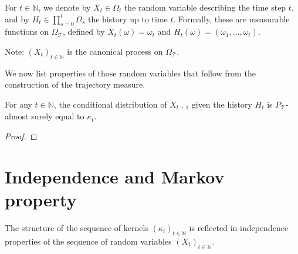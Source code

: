 \begin{definition}\label{def:history}
For $t \in \mathbb{N}$, we denote by $X_t \in \Omega_t$ the random variable describing the time step $t$, and by $H_t \in \prod_{s=0}^t \Omega_s$ the history up to time $t$.
Formally, these are measurable functions on $\Omega_{\mathcal{T}}$, defined by $X_t(\omega) = \omega_t$ and $H_t(\omega) = (\omega_1, \ldots, \omega_t)$.
\end{definition}

Note: $(X_t)_{t \in \mathbb{N}}$ is the canonical process on $\Omega_{\mathcal{T}}$.

We now list properties of those random variables that follow from the construction of the trajectory measure.

\begin{lemma}\label{lem:condDistrib_X_add_one}
For any $t \in \mathbb{N}$, the conditional distribution of $X_{t+1}$ given the history $H_t$ is $P_{\mathcal{T}}$-almost surely equal to $\kappa_t$.
\end{lemma}

\begin{proof}

\end{proof}


\section{Independence and Markov property}

The structure of the sequence of kernels $(\kappa_t)_{t \in \mathbb{N}}$ is reflected in independence properties of the sequence of random variables $(X_t)_{t \in \mathbb{N}}$.
